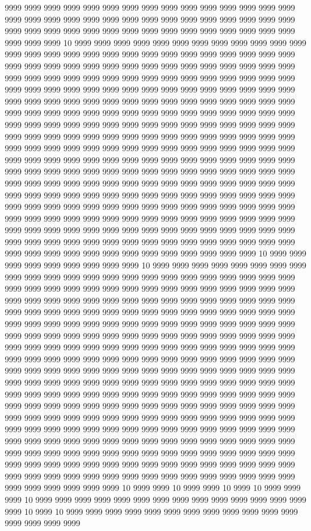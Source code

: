 9999 9999 9999 9999 9999 9999 9999 9999 9999 9999 9999 9999 9999 9999 9999 9999 9999 9999 9999 9999 9999 9999 9999 9999 9999 9999 9999 9999 9999 9999 9999 9999 9999 9999 9999 9999 9999 9999 9999 9999 9999 9999 9999 9999 9999 9999 9999 9999 10 9999 9999 9999 9999 9999 9999 9999 9999 9999 9999 9999 9999 9999 9999 9999 9999 9999 9999 9999 9999 9999 9999 9999 9999 9999 9999 9999 9999 9999 9999 9999 9999 9999 9999 9999 9999 9999 9999 9999 9999 9999 9999 9999 9999 9999 9999 9999 9999 9999 9999 9999 9999 9999 9999 9999 9999 9999 9999 9999 9999 9999 9999 9999 9999 9999 9999 9999 9999 9999 9999 9999 9999 9999 9999 9999 9999 9999 9999 9999 9999 9999 9999 9999 9999 9999 9999 9999 9999 9999 9999 9999 9999 9999 9999 9999 9999 9999 9999 9999 9999 9999 9999 9999 9999 9999 9999 9999 9999 9999 9999 9999 9999 9999 9999 9999 9999 9999 9999 9999 9999 9999 9999 9999 9999 9999 9999 9999 9999 9999 9999 9999 9999 9999 9999 9999 9999 9999 9999 9999 9999 9999 9999 9999 9999 9999 9999 9999 9999 9999 9999 9999 9999 9999 9999 9999 9999 9999 9999 9999 9999 9999 9999 9999 9999 9999 9999 9999 9999 9999 9999 9999 9999 9999 9999 9999 9999 9999 9999 9999 9999 9999 9999 9999 9999 9999 9999 9999 9999 9999 9999 9999 9999 9999 9999 9999 9999 9999 9999 9999 9999 9999 9999 9999 9999 9999 9999 9999 9999 9999 9999 9999 9999 9999 9999 9999 9999 9999 9999 9999 9999 9999 9999 9999 9999 9999 9999 9999 9999 9999 9999 9999 9999 9999 9999 9999 9999 9999 9999 9999 9999 9999 9999 9999 9999 9999 9999 9999 9999 9999 9999 9999 9999 9999 9999 9999 9999 9999 9999 9999 9999 9999 9999 9999 9999 9999 9999 9999 9999 9999 9999 9999 9999 9999 9999 9999 9999 9999 9999 9999 9999 10 9999 9999 9999 9999 9999 9999 9999 9999 9999 10 9999 9999 9999 9999 9999 9999 9999 9999 9999 9999 9999 9999 9999 9999 9999 9999 9999 9999 9999 9999 9999 9999 9999 9999 9999 9999 9999 9999 9999 9999 9999 9999 9999 9999 9999 9999 9999 9999 9999 9999 9999 9999 9999 9999 9999 9999 9999 9999 9999 9999 9999 9999 9999 9999 9999 9999 9999 9999 9999 9999 9999 9999 9999 9999 9999 9999 9999 9999 9999 9999 9999 9999 9999 9999 9999 9999 9999 9999 9999 9999 9999 9999 9999 9999 9999 9999 9999 9999 9999 9999 9999 9999 9999 9999 9999 9999 9999 9999 9999 9999 9999 9999 9999 9999 9999 9999 9999 9999 9999 9999 9999 9999 9999 9999 9999 9999 9999 9999 9999 9999 9999 9999 9999 9999 9999 9999 9999 9999 9999 9999 9999 9999 9999 9999 9999 9999 9999 9999 9999 9999 9999 9999 9999 9999 9999 9999 9999 9999 9999 9999 9999 9999 9999 9999 9999 9999 9999 9999 9999 9999 9999 9999 9999 9999 9999 9999 9999 9999 9999 9999 9999 9999 9999 9999 9999 9999 9999 9999 9999 9999 9999 9999 9999 9999 9999 9999 9999 9999 9999 9999 9999 9999 9999 9999 9999 9999 9999 9999 9999 9999 9999 9999 9999 9999 9999 9999 9999 9999 9999 9999 9999 9999 9999 9999 9999 9999 9999 9999 9999 9999 9999 9999 9999 9999 9999 9999 9999 9999 9999 9999 9999 9999 9999 9999 9999 9999 9999 9999 9999 9999 9999 9999 9999 9999 9999 9999 9999 9999 9999 9999 9999 9999 9999 9999 9999 9999 9999 9999 9999 9999 9999 9999 9999 9999 9999 9999 9999 9999 9999 9999 9999 9999 9999 9999 9999 9999 9999 9999 9999 9999 9999 9999 9999 9999 10 9999 9999 10 9999 9999 10 9999 10 9999 9999 9999 10 9999 9999 9999 9999 9999 9999 9999 9999 9999 9999 9999 9999 9999 9999 9999 10 9999 10 9999 9999 9999 9999 9999 9999 9999 9999 9999 9999 9999 9999 9999 9999 9999 9999 